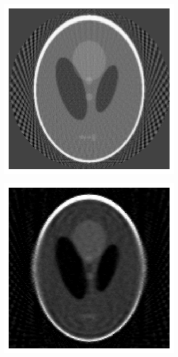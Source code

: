 \documentclass[12pt]{article}
\begin{document}
\begin{figure}
\begin{subfigure}{.073\textwidth}
\end{subfigure}%
\begin{subfigure}{.25\textwidth}
    \centering
    \includegraphics[width=\textwidth]{../figures/FBP-full.png}
\end{subfigure}
\begin{subfigure}{.25\textwidth}
    \centering
    \includegraphics[width=\textwidth]{../figures/TV-full.png}

\end{subfigure}
\end{figure}
\end{document}
